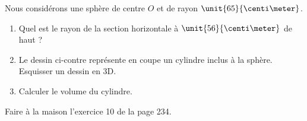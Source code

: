 
\begin{exercice}\label{exosmath-0094}

\begin{wrapfigure}{r}{0.2\textwidth}
    \centering
    \vspace{-0.5cm}

\end{wrapfigure}

    Nous considérons une sphère de centre \( O\) et de rayon \( \unit{65}{\centi\meter}\).
        \begin{enumerate}
            \item
                Quel est le rayon de la section horizontale à \( \unit{56}{\centi\meter}\) de haut ?
            \item
                Le dessin ci-contre représente en coupe un cylindre inclus à la sphère. Esquisser un dessin en 3D.
            \item
                Calculer le volume du cylindre.
        \end{enumerate}

%

        Faire à la maison l'exercice 10 de la page 234.

\end{exercice}
